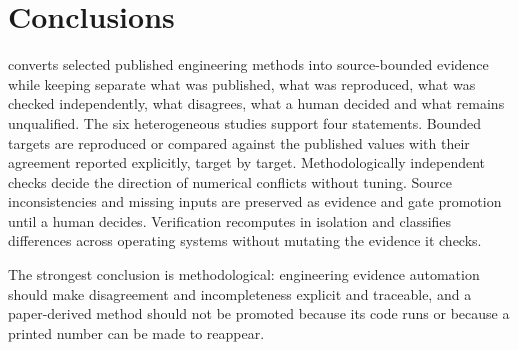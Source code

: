 \section{Conclusions}
\label{sec:conclusion}

\engiproof{} converts selected published engineering methods into source-bounded evidence while keeping separate what was published, what was reproduced, what was checked independently, what disagrees, what a human decided and what remains unqualified. The six heterogeneous studies support four statements. Bounded targets are reproduced or compared against the published values with their agreement reported explicitly, target by target. Methodologically independent checks decide the direction of numerical conflicts without tuning. Source inconsistencies and missing inputs are preserved as evidence and gate promotion until a human decides. Verification recomputes in isolation and classifies differences across operating systems without mutating the evidence it checks.

The strongest conclusion is methodological: engineering evidence automation should make disagreement and incompleteness explicit and traceable, and a paper-derived method should not be promoted because its code runs or because a printed number can be made to reappear.
